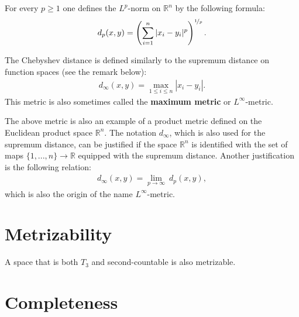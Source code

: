 	\begin{example}[p-metric]
		For every $p\geq1$ one defines the $L^p$-norm on $\mathbb{R}^n$ by the following formula:
		\begin{gather}
			\label{topology:p_metric}
			d_p(x,y) = \left(\sum_{i=1}^n|x_i-y_i|^p\right)^{\nicefrac{1}{p}}.
		\end{gather}
	\end{example}
        \begin{example}
        	The Chebyshev distance is defined similarly to the supremum distance on function spaces (see the remark below):
		\begin{gather}
        	    	\label{topology:chebyshev_distance}
        	    	d_\infty(x,y) = \max_{1\leq i\leq n}|x_i - y_i|.
		\end{gather}
            	This metric is also sometimes called the \textbf{maximum metric} or $L^\infty$-metric.
	\end{example}
        \begin{remark}
        	The above metric is also an example of a product metric defined on the Euclidean product space $\mathbb{R}^n$. The notation $d_\infty$, which is also used for the supremum distance, can be justified if the space $\mathbb{R}^n$ is identified with the set of maps $\{1,...,n\}\rightarrow \mathbb{R}$ equipped with the supremum distance. Another justification is the following relation:
		\begin{gather}
			d_\infty(x,y) = \lim_{p\rightarrow\infty}\ d_p(x,y),
		\end{gather}
		which is also the origin of the name $L^\infty$-metric.
        \end{remark}

\section{Metrizability}

	\begin{theorem}
		A space that is both $T_3$ and second-countable is also metrizable.
	\end{theorem}

\section{Completeness}

